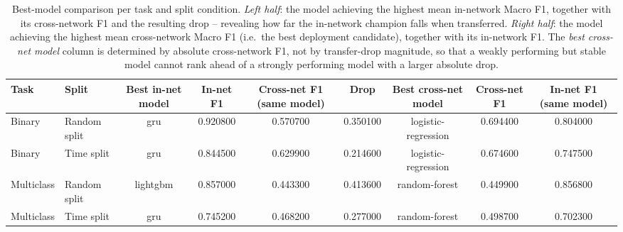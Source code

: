 \begin{table}
\caption{Best-model comparison per task and split condition. \textit{Left half}: the model achieving the highest mean in-network Macro F1, together with its cross-network F1 and the resulting drop -- revealing how far the in-network champion falls when transferred. \textit{Right half}: the model achieving the highest mean cross-network Macro F1 (i.e.\ the best deployment candidate), together with its in-network F1. The \emph{best cross-net model} column is determined by absolute cross-network F1, not by transfer-drop magnitude, so that a weakly performing but stable model cannot rank ahead of a strongly performing model with a larger absolute drop.}
\label{tab:q3_best_model}
\begin{tabular}{llccccccc}
\toprule
Task & Split & Best in-net model & In-net F1 & Cross-net F1 (same model) & Drop & Best cross-net model & Cross-net F1 & In-net F1 (same model) \\
\midrule
Binary & Random split & gru & 0.920800 & 0.570700 & 0.350100 & logistic-regression & 0.694400 & 0.804000 \\
Binary & Time split & gru & 0.844500 & 0.629900 & 0.214600 & logistic-regression & 0.674600 & 0.747500 \\
Multiclass & Random split & lightgbm & 0.857000 & 0.443300 & 0.413600 & random-forest & 0.449900 & 0.856800 \\
Multiclass & Time split & gru & 0.745200 & 0.468200 & 0.277000 & random-forest & 0.498700 & 0.702300 \\
\bottomrule
\end{tabular}
\end{table}
